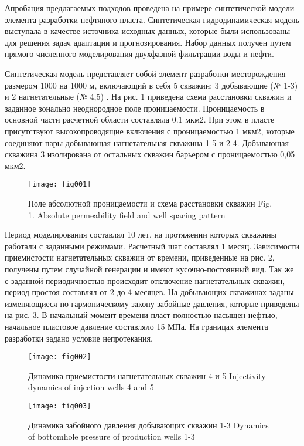 \documentclass{article}
\begin{document}
Апробация предлагаемых подходов проведена на примере синтетической модели элемента разработки нефтяного пласта. Синтетическая гидродинамическая модель выступала в качестве источника исходных данных, которые были использованы для решения задач адаптации и прогнозирования. Набор данных получен путем прямого численного моделирования двухфазной фильтрации воды и нефти. 

Синтетическая модель представляет собой элемент разработки месторождения размером 1000 на 1000 м, включающий в себя 5 скважин: 3 добывающие (№ 1-3) и 2 нагнетательные (№ 4,5) . На рис. 1 приведена схема расстановки скважин и заданное зонально неоднородное поле проницаемости. Проницаемость в основной части расчетной области составляла 0.1 мкм2. При этом в пласте присутствуют высокопроводящие включения с проницаемостью 1 мкм2, которые соединяют пары добывающая-нагнетательная скважина 1-5 и 2-4. Добывающая скважина 3 изолирована от остальных скважин барьером с проницаемостью 0,05 мкм2.

\begin{figure}
	\centering
	\texttt{[image: fig001]}
	\caption{Поле абсолютной проницаемости и схема расстановки скважин Fig. 1. Absolute permeability field and well spacing pattern}
	\label{fig:fig001}
\end{figure}

Период моделирования составлял 10 лет, на протяжении которых скважины работали с заданными режимами. Расчетный шаг составлял 1 месяц. Зависимости приемистости нагнетательных скважин от времени, приведенные на рис. 2, получены путем случайной генерации и имеют кусочно-постоянный вид. Так же с заданной периодичностью происходит отключение нагнетательных скважин, период простоя составлял от 2 до 4 месяцев. На добывающих скважинах заданы изменяющиеся по гармоническому закону забойные давления, которые приведены на рис. 3. В начальный момент времени пласт полностью насыщен нефтью, начальное пластовое давление составляло 15 МПа. На границах элемента разработки задано условие непротекания.

\begin{figure}
	\centering
	\texttt{[image: fig002]}
	\caption{Динамика приемистости нагнетательных скважин 4 и 5 Injectivity dynamics of injection wells 4 and 5}
	\label{fig:fig002}
\end{figure}

\begin{figure}
	\centering
	\texttt{[image: fig003]}
	\caption{Динамика забойного давления добывающих скважин 1-3 Dynamics of bottomhole pressure of production wells 1-3}
	\label{fig:fig003}
\end{figure}
\end{document}
